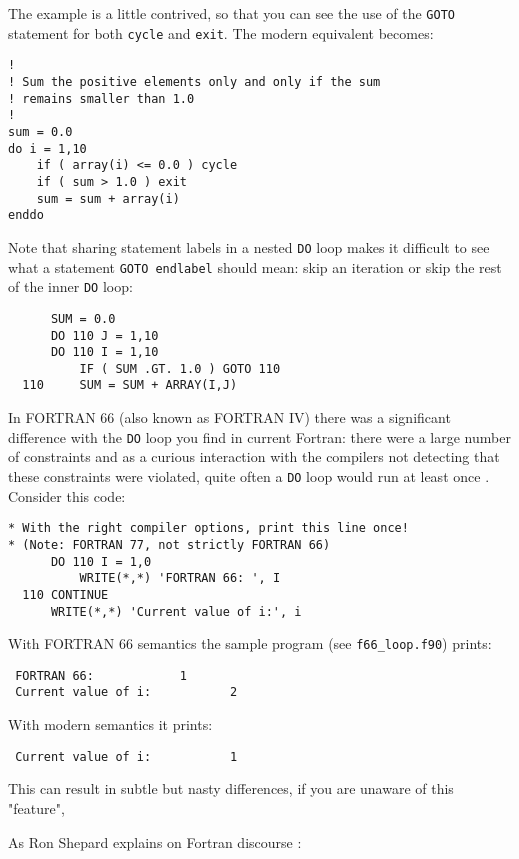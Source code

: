 %
The example is a little contrived, so that you can see the use of the \verb+GOTO+ statement
for both \verb+cycle+ and \verb+exit+. The modern equivalent becomes:
%
\begin{verbatim}
!
! Sum the positive elements only and only if the sum
! remains smaller than 1.0
!
sum = 0.0
do i = 1,10
    if ( array(i) <= 0.0 ) cycle
    if ( sum > 1.0 ) exit
    sum = sum + array(i)
enddo
\end{verbatim}
%
Note that sharing statement labels in a nested \verb+DO+ loop makes it difficult to
see what a statement \verb+GOTO endlabel+ should mean: skip an iteration or skip
the rest of the inner \verb+DO+ loop:
%
\begin{verbatim}
      SUM = 0.0
      DO 110 J = 1,10
      DO 110 I = 1,10
          IF ( SUM .GT. 1.0 ) GOTO 110
  110     SUM = SUM + ARRAY(I,J)
\end{verbatim}
%
In FORTRAN 66 (also known as FORTRAN IV) there was a significant difference with
the \verb+DO+ loop you find in current Fortran: there were a large number of
constraints and as a curious interaction with the compilers not detecting that
these constraints were violated, quite often a \verb+DO+ loop would run at least once \cite{F66DoLoops}.
Consider this code:
%
\begin{verbatim}
* With the right compiler options, print this line once!
* (Note: FORTRAN 77, not strictly FORTRAN 66)
      DO 110 I = 1,0
          WRITE(*,*) 'FORTRAN 66: ', I
  110 CONTINUE
      WRITE(*,*) 'Current value of i:', i
\end{verbatim}
%
With FORTRAN 66 semantics the sample program (see \verb+f66_loop.f90+) prints:
%
\begin{verbatim}
 FORTRAN 66:            1
 Current value of i:           2
\end{verbatim}
With modern semantics it prints:
%
\begin{verbatim}
 Current value of i:           1
\end{verbatim}
%
This can result in subtle but nasty differences, if you are unaware of this
"feature",

As Ron Shepard explains on Fortran discourse \cite{F66Explanation}:

